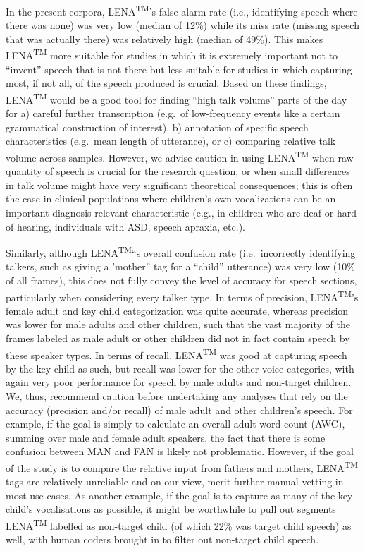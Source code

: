 \documentclass[english,floatsintext,man]{apa6}
\begin{document}
In the present corpora, LENA\textsuperscript{TM}'s false alarm rate
(i.e., identifying speech where there was none) was very low (median of
12\%) while its miss rate (missing speech that was actually there) was
relatively high (median of 49\%). This makes LENA\textsuperscript{TM}
more suitable for studies in which it is extremely important not to
\enquote{invent} speech that is not there but less suitable for studies
in which capturing most, if not all, of the speech produced is crucial.
Based on these findings, LENA\textsuperscript{TM} would be a good tool
for finding \enquote{high talk volume} parts of the day for a) careful
further transcription (e.g.~of low-frequency events like a certain
grammatical construction of interest), b) annotation of specific speech
characteristics (e.g.~mean length of utterance), or c) comparing
relative talk volume across samples. However, we advise caution in using
LENA\textsuperscript{TM} when raw quantity of speech is crucial for the
research question, or when small differences in talk volume might have
very significant theoretical consequences; this is often the case in
clinical populations where children's own vocalizations can be an
important diagnosis-relevant characteristic (e.g., in children who are
deaf or hard of hearing, individuals with ASD, speech apraxia, etc.).

Similarly, although LENA\textsuperscript{TM}\enquote{s overall confusion
rate (i.e.~incorrectly identifying talkers, such as giving a 'mother}
tag for a \enquote{child} utterance) was very low (10\% of all frames),
this does not fully convey the level of accuracy for speech sections,
particularly when considering every talker type. In terms of precision,
LENA\textsuperscript{TM}'s female adult and key child categorization was
quite accurate, whereas precision was lower for male adults and other
children, such that the vast majority of the frames labeled as male
adult or other children did not in fact contain speech by these speaker
types. In terms of recall, LENA\textsuperscript{TM} was good at
capturing speech by the key child as such, but recall was lower for the
other voice categories, with again very poor performance for speech by
male adults and non-target children. We, thus, recommend caution before
undertaking any analyses that rely on the accuracy (precision and/or
recall) of male adult and other children's speech. For example, if the
goal is simply to calculate an overall adult word count (AWC), summing
over male and female adult speakers, the fact that there is some
confusion between MAN and FAN is likely not problematic. However, if the
goal of the study is to compare the relative input from fathers and
mothers, LENA\textsuperscript{TM} tags are relatively unreliable and on
our view, merit further manual vetting in most use cases. As another
example, if the goal is to capture as many of the key child's
vocalisations as possible, it might be worthwhile to pull out segments
LENA\textsuperscript{TM} labelled as non-target child (of which 22\% was
target child speech) as well, with human coders brought in to filter out
non-target child speech.
\end{document}
